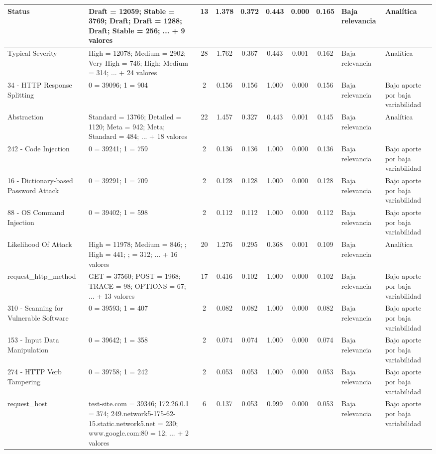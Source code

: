 \begin{table}[h]
\begin{tabular}{|p{2.1cm}|p{3.0cm}|c|c|c|c|c|c|p{2.5cm}|p{2.8cm}|}
\hline
Status & Draft = 12059; Stable = 3769; Draft; Draft = 1288; Draft; Stable = 256; ... + 9 valores & 13 & 1.378 & 0.372 & 0.443 & 0.000 & 0.165 & Baja relevancia & Analítica \\
\hline
Typical Severity & High = 12078; Medium = 2902; Very High = 746; High; Medium = 314; ... + 24 valores & 28 & 1.762 & 0.367 & 0.443 & 0.001 & 0.162 & Baja relevancia & Analítica \\
\hline
34 - HTTP Response Splitting & 0 = 39096; 1 = 904 & 2 & 0.156 & 0.156 & 1.000 & 0.000 & 0.156 & Baja relevancia & Bajo aporte por baja variabilidad \\
\hline
Abstraction & Standard = 13766; Detailed = 1120; Meta = 942; Meta; Standard = 484; ... + 18 valores & 22 & 1.457 & 0.327 & 0.443 & 0.001 & 0.145 & Baja relevancia & Analítica \\
\hline
242 - Code Injection & 0 = 39241; 1 = 759 & 2 & 0.136 & 0.136 & 1.000 & 0.000 & 0.136 & Baja relevancia & Bajo aporte por baja variabilidad \\
\hline
16 - Dictionary-based Password Attack & 0 = 39291; 1 = 709 & 2 & 0.128 & 0.128 & 1.000 & 0.000 & 0.128 & Baja relevancia & Bajo aporte por baja variabilidad \\
\hline
88 - OS Command Injection & 0 = 39402; 1 = 598 & 2 & 0.112 & 0.112 & 1.000 & 0.000 & 0.112 & Baja relevancia & Bajo aporte por baja variabilidad \\
\hline
Likelihood Of Attack & High = 11978; Medium = 846; ; High = 441; ; = 312; ... + 16 valores & 20 & 1.276 & 0.295 & 0.368 & 0.001 & 0.109 & Baja relevancia & Analítica \\
\hline
request\_http\_method & GET = 37560; POST = 1968; TRACE = 98; OPTIONS = 67; ... + 13 valores & 17 & 0.416 & 0.102 & 1.000 & 0.000 & 0.102 & Baja relevancia & Bajo aporte por baja variabilidad \\
\hline
310 - Scanning for Vulnerable Software & 0 = 39593; 1 = 407 & 2 & 0.082 & 0.082 & 1.000 & 0.000 & 0.082 & Baja relevancia & Bajo aporte por baja variabilidad \\
\hline
153 - Input Data Manipulation & 0 = 39642; 1 = 358 & 2 & 0.074 & 0.074 & 1.000 & 0.000 & 0.074 & Baja relevancia & Bajo aporte por baja variabilidad \\
\hline
274 - HTTP Verb Tampering & 0 = 39758; 1 = 242 & 2 & 0.053 & 0.053 & 1.000 & 0.000 & 0.053 & Baja relevancia & Bajo aporte por baja variabilidad \\
\hline
request\_host & test-site.com = 39346; 172.26.0.1 = 374; 249.network5-175-62-15.static.network5.net = 230; www.google.com:80 = 12; ... + 2 valores & 6 & 0.137 & 0.053 & 0.999 & 0.000 & 0.053 & Baja relevancia & Bajo aporte por baja variabilidad \\

\end{tabular}
\end{table}
